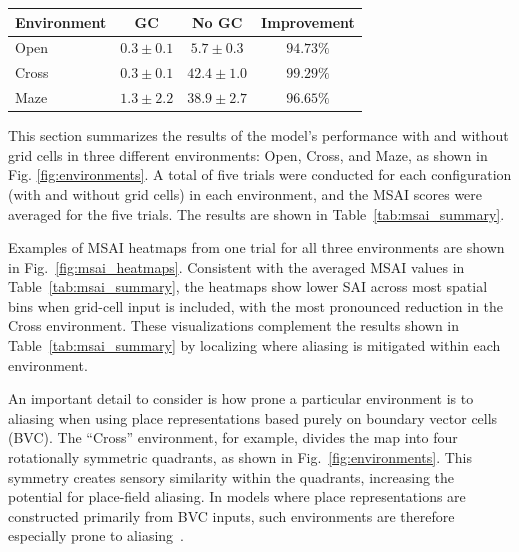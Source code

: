 \documentclass[conference]{IEEEtran}
\begin{document}
\begin{center}
\label{tab:msai_summary}

\begin{tabular}{l c c c}
\hline
\textbf{Environment} & \textbf{GC} & \textbf{No GC} & \textbf{Improvement} \\
\hline
Open  & $0.3 \pm 0.1$ & $5.7 \pm 0.3$  & $94.73\%$ \\
Cross & $0.3 \pm 0.1$ & $42.4 \pm 1.0$ & $99.29\%$ \\
Maze  & $1.3 \pm 2.2$ & $38.9 \pm 2.7$ & $96.65\%$ \\
\hline
\end{tabular}
\end{center}
This section summarizes the results of the model's performance with and without grid cells in three different environments: Open, Cross, and Maze, as shown in Fig. \ref{fig:environments}. A total of five trials were conducted for each configuration (with and without grid cells) in each environment, and the MSAI scores were averaged for the five trials. 
The results are shown in Table~\ref{tab:msai_summary}. 

Examples of MSAI heatmaps from one trial for all three environments are shown in Fig.~\ref{fig:msai_heatmaps}. Consistent with the averaged MSAI values in Table~\ref{tab:msai_summary}, the heatmaps show lower SAI across most spatial bins when grid-cell input is included, with the most pronounced reduction in the Cross environment. These visualizations complement the results shown in Table~\ref{tab:msai_summary} by localizing where aliasing is mitigated within each environment.

An important detail to consider is how prone a particular environment is to aliasing when using place representations based purely on boundary vector cells (BVC). The ``Cross'' environment, for example, divides the map into four rotationally symmetric quadrants, as shown in Fig.~\ref{fig:environments}. This symmetry creates sensory similarity within the quadrants, increasing the potential for place-field aliasing. In models where place representations are constructed primarily from BVC inputs, such environments are therefore especially prone to aliasing~\cite{skaggs1998spatial}.
\end{document}
